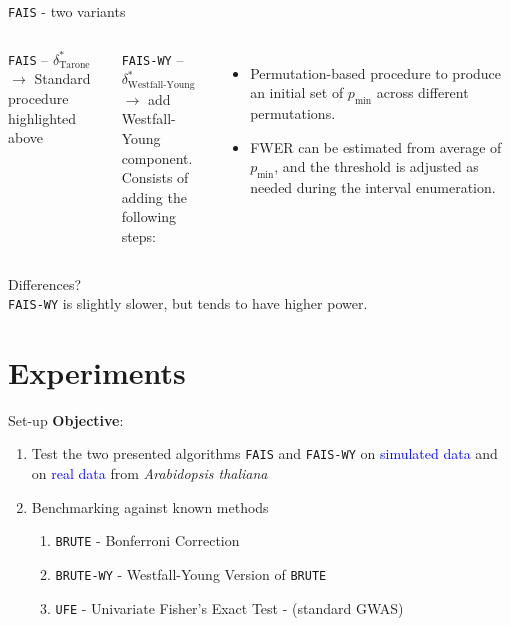 \documentclass[aspectratio=32, 10pt]{beamer}
\begin{document}
\begin{frame}[fragile]{\texttt{FAIS} - two variants}
\begin{columns}[T,onlytextwidth]
\texttt{FAIS} -- $\delta^*_{\text{Tarone}}$\\
\vspace{12pt}
$\to$ Standard procedure highlighted above

\texttt{FAIS-WY} -- $\delta^*_{\text{Westfall-Young}}$\\
\vspace{12pt}
$\to$ add Westfall-Young component.\\
Consists of adding the following steps:
\begin{itemize}
    \item Permutation-based procedure to produce an initial set of $p_{\text{min}}$ across different permutations.
    \item FWER can be estimated from average of $p_{\text{min}}$, and the threshold is adjusted as needed during the interval enumeration.
\end{itemize}
\end{columns}
Differences?\\
\texttt{FAIS-WY} is slightly slower, but tends to have higher power.
\end{frame}

\section{Experiments}

\begin{frame}[fragile]{Set-up}
\textbf{Objective}: 
\begin{enumerate}
\item Test the two presented algorithms \texttt{FAIS} and \texttt{FAIS-WY} on \textcolor{blue}{simulated data} and on \textcolor{blue}{real data} from \textit{Arabidopsis thaliana}
\item Benchmarking against known methods
\begin{enumerate}
\item \texttt{BRUTE} -  Bonferroni Correction
\item \texttt{BRUTE-WY} - Westfall-Young Version of \texttt{BRUTE}
\item \texttt{UFE} - Univariate Fisher's Exact Test - (standard GWAS)
\end{enumerate}
\end{enumerate}
\end{frame}
\end{document}
